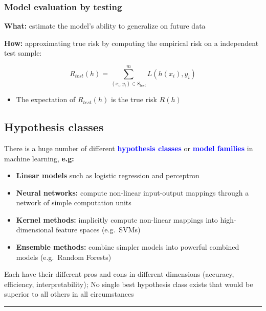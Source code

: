 \documentclass[12pt]{article}
\begin{document}
\subsubsection{Model evaluation by testing
}\label{model-evaluation-by-testing}

\textbf{What:} estimate the model's ability to generalize on future data

\textbf{How:} approximating true risk by computing the
empirical risk on a independent test sample:

\[R_{test}(h) = \sum_{(x_i,y_i) \in S_{test}}^{m} L(h(x_i),y_i)\]

\begin{itemize}
  \item The expectation of $R_{test}(h)$ is the true risk $R(h)$
\end{itemize}





\subsection{Hypothesis classes }\label{hypothesis-classes}

There is a huge number of different \textbf{\textcolor{blue}{hypothesis classes}} or
\textbf{\textcolor{blue}{model families}} in machine learning, \textbf{e.g:}

\begin{itemize}
  \item
    \textbf{Linear models} such as logistic regression and perceptron
  \item
    \textbf{Neural networks:} compute non-linear input-output mappings
    through a network of simple computation units
  \item
    \textbf{Kernel methods:} implicitly compute non-linear mappings into
    high-dimensional feature spaces (e.g.~SVMs)
  \item
    \textbf{Ensemble methods:} combine simpler models into powerful
    combined models (e.g.~Random Forests)
\end{itemize}

Each have their different pros and cons in different dimensions
(accuracy, efficiency, interpretability); No single best hypothesis
class exists that would be superior to all others in all circumstances

\begin{center}\rule{3in}{0.4pt}\end{center}
\end{document}
